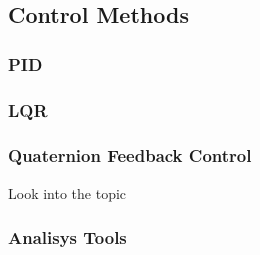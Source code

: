 \subsection{Control Methods}
    \subsubsection{PID}
    \subsubsection{LQR}
    \subsubsection{Quaternion Feedback Control}
        Look into the topic
    \subsubsection{Analisys Tools}